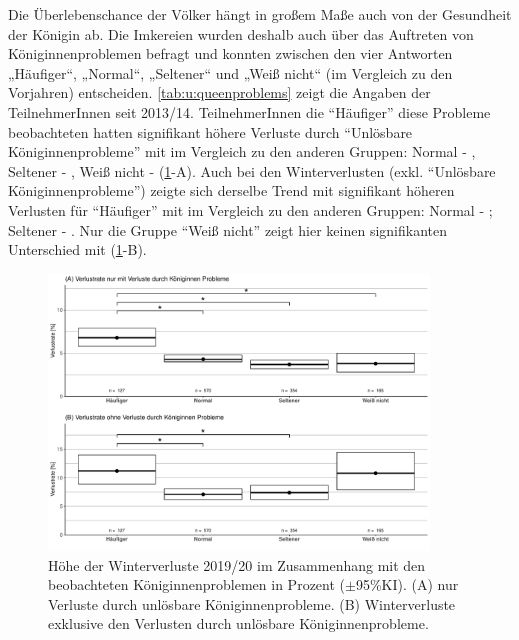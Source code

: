 Die Überlebenschance der Völker hängt in großem Maße auch von der Gesundheit der Königin ab. Die Imkereien wurden deshalb auch über das Auftreten von Königinnenproblemen befragt und konnten zwischen den vier Antworten „Häufiger``, „Normal``, „Seltener`` und „Weiß nicht`` (im Vergleich zu den Vorjahren) entscheiden. \cref{tab:u:queenproblems} zeigt die Angaben der TeilnehmerInnen seit 2013/14.
\newline
TeilnehmerInnen die \enquote{Häufiger} diese Probleme beobachteten hatten signifikant höhere Verluste durch \enquote{Unlösbare Königinnenprobleme} mit  im Vergleich zu den anderen Gruppen: Normal - , Seltener - , Weiß nicht -  (\cref{fig:u:queen:problems}-A). Auch bei den Winterverlusten (exkl. \enquote{Unlösbare Königinnenprobleme}) zeigte sich derselbe Trend mit signifikant höheren Verlusten für \enquote{Häufiger} mit  im Vergleich zu den anderen Gruppen: Normal - ; Seltener - . Nur die Gruppe \enquote{Weiß nicht} zeigt hier keinen signifikanten Unterschied mit  (\cref{fig:u:queen:problems}-B).



\begin{figure}[H]
  \centering
  \includegraphics[keepaspectratio,width=0.9\textwidth]{project-U-wintersterblichkeit/figures/plot_queen_subjectiveproblems}
  \caption{Höhe der Winterverluste 2019/20 im Zusammenhang mit den beobachteten Königinnenproblemen in Prozent ($\pm$95\%KI). (A) nur Verluste durch unlösbare Königinnenprobleme. (B) Winterverluste exklusive den Verlusten durch unlösbare Königinnenprobleme.}
  \label{fig:u:queen:problems}
\end{figure}


